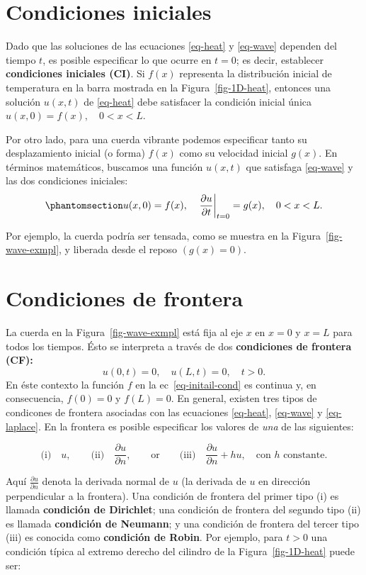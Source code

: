 \documentclass[
  spanish,
  us-letterpaper,
  DIV=11,
  numbers=noendperiod]{scrreprt}
\theoremstyle{definition}
\theoremstyle{plain}
\theoremstyle{remark}
\begin{document}
\section{Condiciones iniciales}\label{condiciones-iniciales}

Dado que las soluciones de las ecuaciones \ref{eq-heat} y \ref{eq-wave}
dependen del tiempo \(t\), es posible especificar lo que ocurre en
\(t = 0\); es decir, establecer \textbf{condiciones iniciales (CI)}. Si
\(f(x)\) representa la distribución inicial de temperatura en la barra
mostrada en la Figura~\ref{fig-1D-heat}, entonces una solución
\(u(x, t)\) de \ref{eq-heat} debe satisfacer la condición inicial única
\(u(x, 0) = f(x), \quad 0 < x < L\).

Por otro lado, para una cuerda vibrante podemos especificar tanto su
desplazamiento inicial (o forma) \(f(x)\) como su velocidad inicial
\(g(x)\). En términos matemáticos, buscamos una función \(u(x, t)\) que
satisfaga \ref{eq-wave} y las dos condiciones iniciales:
\begin{equation}\phantomsection\label{eq-initail-cond}{
u(x, 0) = f(x), \quad \left. \frac{\partial u}{\partial t} \right|_{t=0} = g(x), \quad 0 < x < L.
}\end{equation}

Por ejemplo, la cuerda podría ser tensada, como se muestra en la
Figura~\ref{fig-wave-exmpl}, y liberada desde el reposo \((g(x)=0)\).

\section{Condiciones de frontera}\label{condiciones-de-frontera}

La cuerda en la Figura~\ref{fig-wave-exmpl} está fija al eje \(x\) en
\(x=0\) y \(x=L\) para todos los tiempos. Ésto se interpreta a través de
dos \textbf{condiciones de frontera (CF):} \[
u(0,t) = 0, \quad u(L,t)=0, \quad t>0.
\] En éste contexto la función \(f\) en la ec~\ref{eq-initail-cond} es
continua y, en consecuencia, \(f(0)=0\) y \(f(L)=0\). En general,
existen tres tipos de condicones de frontera asociadas con las
ecuaciones \ref{eq-heat}, \ref{eq-wave} y \ref{eq-laplace}. En la
frontera es posible especificar los valores de \emph{una} de las
siguientes:

\[
\text{(i)}\quad u, \qquad \text{(ii)}\quad \dfrac{\partial u}{\partial n},\qquad \text{or}\qquad \text{(iii)}\quad \dfrac{\partial u}{\partial n} + hu,\quad \text{con $h$ constante.}
\]

Aquí \(\frac{\partial u}{\partial n}\) denota la derivada normal de
\(u\) (la derivada de \(u\) en dirección perpendicular a la frontera).
Una condición de frontera del primer tipo (i) es llamada
\textbf{condición de Dirichlet}; una condición de frontera del segundo
tipo (ii) es llamada \textbf{condición de Neumann}; y una condición de
frontera del tercer tipo (iii) es conocida como \textbf{condición de
Robin}. Por ejemplo, para \(t>0\) una condición típica al extremo
derecho del cilindro de la Figura~\ref{fig-1D-heat} puede ser:
\end{document}
